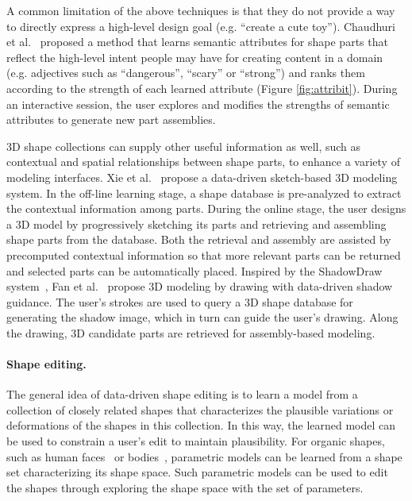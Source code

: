 A common limitation of the above techniques is that they do not provide a way to directly express a high-level design goal (e.g. ``create a cute toy''). Chaudhuri et al.~ proposed a method that learns semantic attributes for shape parts that reflect the high-level intent people may have for creating content in a domain (e.g. adjectives such as ``dangerous'', ``scary'' or ``strong'') and ranks them according to the strength of each learned attribute (Figure \ref{fig:attribit}). During an interactive session, the user explores and modifies the strengths of semantic attributes to generate new part assemblies.

3D shape collections can supply other useful information as well, such as contextual and spatial relationships between shape parts,
to enhance a variety of modeling interfaces.
Xie et al.~\cite{Xie:2013:S2D} propose a data-driven sketch-based 3D modeling system.
In the off-line learning stage, a shape database is pre-analyzed to extract the contextual information among parts.
During the online stage, the user designs a 3D model by progressively sketching its parts and retrieving and assembling
shape parts from the database. Both the retrieval and assembly are assisted by
precomputed contextual information so that more relevant parts can be returned and selected parts can be automatically placed.
Inspired by the ShadowDraw system~\cite{Lee:2011:SD}, Fan et al.~\cite{Fan:2013:MBD} propose 3D modeling by drawing with
data-driven shadow guidance. The user's strokes are used to query a 3D shape database for generating the shadow image,
which in turn can guide the user's drawing. Along the drawing, 3D candidate parts are retrieved for assembly-based modeling.


\paragraph*{Shape editing.}
The general idea of data-driven shape editing is to learn a model from a collection of closely related shapes
that characterizes the plausible variations or deformations of the shapes in this collection.  In this way, the learned model
can be used to constrain a user's edit to maintain plausibility.
For organic shapes, such as human faces~\cite{Blanz:1999:MMS,Chen:2014:FED} or bodies~\cite{Allen:2003:SHB},
parametric models can be learned from a shape set characterizing its shape space.
Such parametric models can be used to edit the shapes through exploring the shape space with the set of parameters.

